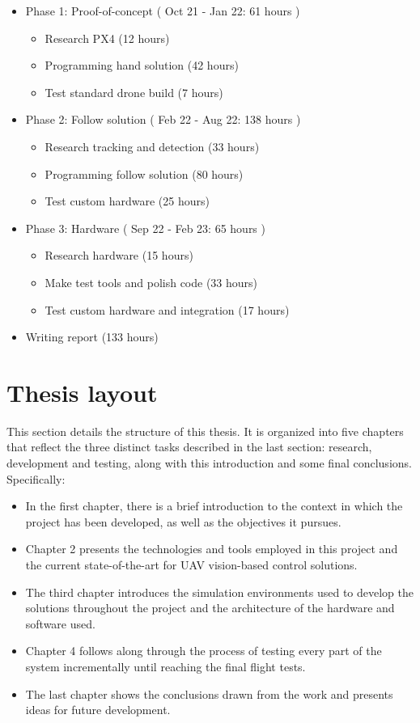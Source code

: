 \begin{itemize}
    \item Phase 1: Proof-of-concept ( Oct 21 - Jan 22: 61 hours )
    \begin{itemize}
        \item Research PX4 (12 hours)
        \item Programming hand solution (42 hours)
        \item Test standard drone build (7 hours)
    \end{itemize}
    \item Phase 2: Follow solution ( Feb 22 - Aug 22: 138 hours )
    \begin{itemize}
        \item Research tracking and detection (33 hours)
        \item Programming follow solution (80 hours)
        \item Test custom hardware (25 hours)
    \end{itemize}
    \item Phase 3: Hardware ( Sep 22 - Feb 23: 65 hours )
    \begin{itemize}
        \item Research hardware (15 hours)
        \item Make test tools and polish code (33 hours)
        \item Test custom hardware and integration (17 hours)
    \end{itemize}
    \item Writing report (133 hours)
\end{itemize}


\section{Thesis layout}
\label{sec:layout}

This section details the structure of this thesis.
It is organized into five chapters that reflect the three distinct tasks described in the last section: research, development and testing, along with this introduction and some final conclusions.
Specifically:

\begin{itemize}
    \item In the first chapter, there is a brief introduction to the context in which the project has been developed, as well as the objectives it pursues.
    \item Chapter 2 presents the technologies and tools employed in this project and the current state-of-the-art for UAV vision-based control solutions.
    \item The third chapter introduces the simulation environments used to develop the solutions throughout the project and the architecture of the hardware and software used.
    \item Chapter 4 follows along through the process of testing every part of the system incrementally until reaching the final flight tests.
    \item The last chapter shows the conclusions drawn from the work and presents ideas for future development.
\end{itemize}


\cleardoublepage